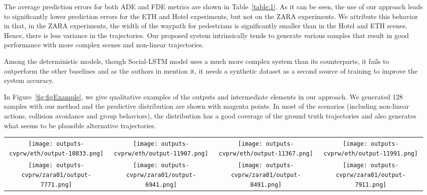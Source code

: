 \documentclass[10pt,twocolumn,letterpaper]{article}
\begin{document}
The average prediction errors for both ADE and FDE metrics are shown in Table~\ref{table:1}. As it can be seen, the use of our approach leads to significantly lower prediction errors for the ETH and Hotel experiments, but not on the ZARA experiments. We attribute this behavior in that, in the ZARA experiments, the width of the waypath for pedestrians is significantly smaller than in the Hotel and ETH scenes. Hence, there is less variance in the trajectories. Our proposed system intrinsically tends to generate various samples that result in good performance with more complex scenes and non-linear trajectories.

Among the deterministic models, though Social-LSTM model uses a much more complex system than its counterparts, it fails to outperform the other baselines and as the authors in \cite{SocialGAN2018} mention it, it needs a synthetic dataset as a second source of training to improve the system accuracy.

In Figure~\ref{fig:figExample}, we give qualitative examples of the outputs and intermediate elements in our approach. We generated 128 samples with our method and the predictive distribution are shown with magenta points. In most of the scenarios (including non-linear actions, collision avoidance and group behaviors), the distribution has a good coverage of the ground truth trajectories and also generates what seems to be plausible alternative trajectories.







\begin{figure*}
\begin{center}
\begin{tabular}{cccc}
	\texttt{[image: outputs-cvprw/eth/output-10833.png]}&
	\texttt{[image: outputs-cvprw/eth/output-11907.png]}&
	\texttt{[image: outputs-cvprw/eth/output-11367.png]}&	
	\texttt{[image: outputs-cvprw/eth/output-11991.png]}\\
	\texttt{[image: outputs-cvprw/zara01/output-7771.png]}&	
	\texttt{[image: outputs-cvprw/zara01/output-6941.png]}&
	\texttt{[image: outputs-cvprw/zara01/output-8491.png]}&
	\texttt{[image: outputs-cvprw/zara01/output-7911.png]}\\
\end{tabular}
\end{center}
\caption{In this figure, we illustrate our sample outputs (in magenta color).
The observed trajectories are shown in blue and ground truth prediction and constant-velocity predictions are shown in cyan and orange lines, respectively. [Best viewed in color.]}
\label{fig:figExample}
\vspace{-0.1cm}
\end{figure*}
\end{document}
